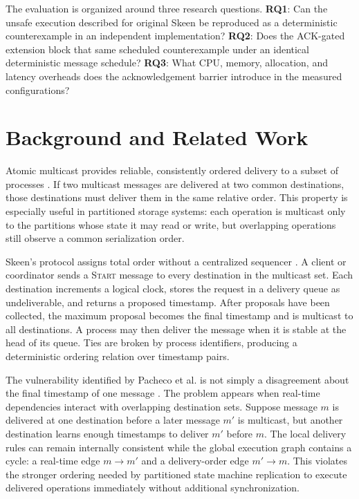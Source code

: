 \documentclass[conference]{IEEEtran}
\begin{document}
The evaluation is organized around three research questions. \textbf{RQ1}: Can the unsafe execution described for original Skeen be reproduced as a deterministic counterexample in an independent implementation? \textbf{RQ2}: Does the ACK-gated extension block that same scheduled counterexample under an identical deterministic message schedule? \textbf{RQ3}: What CPU, memory, allocation, and latency overheads does the acknowledgement barrier introduce in the measured configurations?

\section{Background and Related Work}

Atomic multicast provides reliable, consistently ordered delivery to a subset of processes \cite{hadzilacos}. If two multicast messages are delivered at two common destinations, those destinations must deliver them in the same relative order. This property is especially useful in partitioned storage systems: each operation is multicast only to the partitions whose state it may read or write, but overlapping operations still observe a common serialization order.

Skeen's protocol assigns total order without a centralized sequencer \cite{skeen}. A client or coordinator sends a \textsc{Start} message to every destination in the multicast set. Each destination increments a logical clock, stores the request in a delivery queue as undeliverable, and returns a proposed timestamp. After proposals have been collected, the maximum proposal becomes the final timestamp and is multicast to all destinations. A process may then deliver the message when it is stable at the head of its queue. Ties are broken by process identifiers, producing a deterministic ordering relation over timestamp pairs.

The vulnerability identified by Pacheco et al. is not simply a disagreement about the final timestamp of one message \cite{pacheco}. The problem appears when real-time dependencies interact with overlapping destination sets. Suppose message $m$ is delivered at one destination before a later message $m'$ is multicast, but another destination learns enough timestamps to deliver $m'$ before $m$. The local delivery rules can remain internally consistent while the global execution graph contains a cycle: a real-time edge $m \rightarrow m'$ and a delivery-order edge $m' \rightarrow m$. This violates the stronger ordering needed by partitioned state machine replication to execute delivered operations immediately without additional synchronization.
\end{document}
